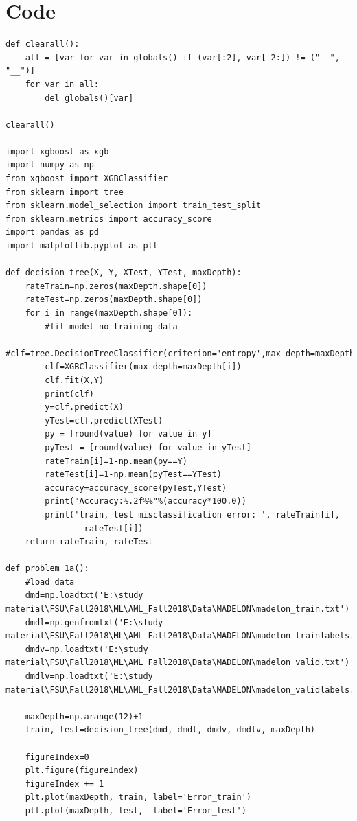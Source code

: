 \documentclass[a4paper]{article}
\begin{document}
\bigskip


\section{Code}
\begin{verbatim}
def clearall():
    all = [var for var in globals() if (var[:2], var[-2:]) != ("__", "__")]
    for var in all:
        del globals()[var] 
        
clearall()

import xgboost as xgb
import numpy as np
from xgboost import XGBClassifier
from sklearn import tree
from sklearn.model_selection import train_test_split
from sklearn.metrics import accuracy_score
import pandas as pd
import matplotlib.pyplot as plt

def decision_tree(X, Y, XTest, YTest, maxDepth):
    rateTrain=np.zeros(maxDepth.shape[0])
    rateTest=np.zeros(maxDepth.shape[0])
    for i in range(maxDepth.shape[0]):
        #fit model no training data
        #clf=tree.DecisionTreeClassifier(criterion='entropy',max_depth=maxDepth[i])     
        clf=XGBClassifier(max_depth=maxDepth[i])
        clf.fit(X,Y)
        print(clf)
        y=clf.predict(X)
        yTest=clf.predict(XTest)
        py = [round(value) for value in y]
        pyTest = [round(value) for value in yTest]
        rateTrain[i]=1-np.mean(py==Y)
        rateTest[i]=1-np.mean(pyTest==YTest)    
        accuracy=accuracy_score(pyTest,YTest)
        print("Accuracy:%.2f%%"%(accuracy*100.0))
        print('train, test misclassification error: ', rateTrain[i],
                rateTest[i])
    return rateTrain, rateTest

def problem_1a():
    #load data
    dmd=np.loadtxt('E:\study material\FSU\Fall2018\ML\AML_Fall2018\Data\MADELON\madelon_train.txt')
    dmdl=np.genfromtxt('E:\study material\FSU\Fall2018\ML\AML_Fall2018\Data\MADELON\madelon_trainlabels.txt')
    dmdv=np.loadtxt('E:\study material\FSU\Fall2018\ML\AML_Fall2018\Data\MADELON\madelon_valid.txt')
    dmdlv=np.loadtxt('E:\study material\FSU\Fall2018\ML\AML_Fall2018\Data\MADELON\madelon_validlabels.txt')
    
    maxDepth=np.arange(12)+1
    train, test=decision_tree(dmd, dmdl, dmdv, dmdlv, maxDepth)
    
    figureIndex=0
    plt.figure(figureIndex)
    figureIndex += 1
    plt.plot(maxDepth, train, label='Error_train')
    plt.plot(maxDepth, test,  label='Error_test')


\end{verbatim}
\end{document}

